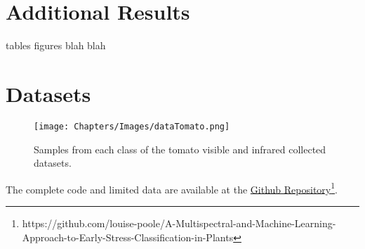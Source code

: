 
\label{Appendix}


\chapter{Additional Results}

tables figures blah blah



   
\chapter{Datasets}
\label{AppendixB}

    \begin{figure}[ht]
        \centering
        \texttt{[image: Chapters/Images/dataTomato.png]}
        \caption{Samples from each class of the tomato visible and infrared collected datasets.}
    \end{figure}


The complete code and limited data are available at the \href{https://github.com/louise-poole/A-Multispectral-and-Machine-Learning-Approach-to-Early-Stress-Classification-in-Plants}{Github Repository}\footnote{https://github.com/louise-poole/A-Multispectral-and-Machine-Learning-Approach-to-Early-Stress-Classification-in-Plants}. 




